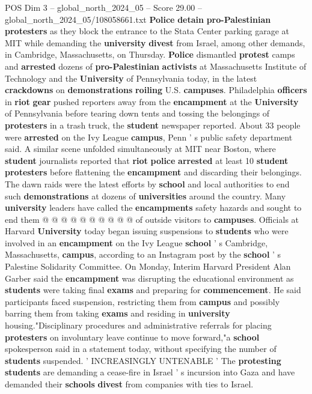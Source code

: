 \begin{textsample}{POS Dim 3 – global\_north\_2024\_05 – Score 29.00 – global\_north\_2024\_05/108058661.txt}  \label{ex:f3_pos_001}
\textbf{Police} \textbf{detain} \textbf{pro-Palestinian} \textbf{protesters} as they block the entrance to the Stata Center parking garage at MIT while demanding the \textbf{university} \textbf{divest} from Israel, among other demands, in Cambridge, Massachusetts, on Thursday. \textbf{Police} dismantled \textbf{protest} camps and \textbf{arrested} dozens of \textbf{pro-Palestinian} \textbf{activists} at Massachusetts Institute of Technology and the \textbf{University} of Pennsylvania today, in the latest \textbf{crackdowns} on \textbf{demonstrations} \textbf{roiling} U.S. \textbf{campuses}.
Philadelphia \textbf{officers} in \textbf{riot} \textbf{gear} pushed reporters away from the \textbf{encampment} at the \textbf{University} of Pennsylvania before tearing down tents and tossing the belongings of \textbf{protesters} in a trash truck, the \textbf{student} newspaper reported.
About 33 people were \textbf{arrested} on the Ivy League \textbf{campus}, Penn ' s public safety department said.
A similar scene unfolded simultaneously at MIT near Boston, where \textbf{student} journalists reported that \textbf{riot} \textbf{police} \textbf{arrested} at least 10 \textbf{student} \textbf{protesters} before flattening the \textbf{encampment} and discarding their belongings.
The dawn raids were the latest efforts by \textbf{school} and local authorities to end such \textbf{demonstrations} at dozens of \textbf{universities} around the country.
Many \textbf{university} leaders have called the \textbf{encampments} safety hazards and sought to end them @ @ @ @ @ @ @ @ @ @ of outside visitors to \textbf{campuses}.
Officials at Harvard \textbf{University} today began issuing suspensions to \textbf{students} who were involved in an \textbf{encampment} on the Ivy League \textbf{school} ' s Cambridge, Massachusetts, \textbf{campus}, according to an Instagram post by the \textbf{school} ' s Palestine Solidarity Committee.
On Monday, Interim Harvard President Alan Garber said the \textbf{encampment} was disrupting the educational environment as \textbf{students} were taking final \textbf{exams} and preparing for \textbf{commencement}.
He said participants faced suspension, restricting them from \textbf{campus} and possibly barring them from taking \textbf{exams} and residing in \textbf{university} housing."Disciplinary procedures and administrative referrals for placing \textbf{protesters} on involuntary leave continue to move forward,"a \textbf{school} spokesperson said in a statement today, without specifying the number of \textbf{students} suspended. ' INCREASINGLY UNTENABLE ' The \textbf{protesting} \textbf{students} are demanding a cease-fire in Israel ' s incursion into Gaza and have demanded their \textbf{schools} \textbf{divest} from companies with ties to Israel.

\end{textsample}
